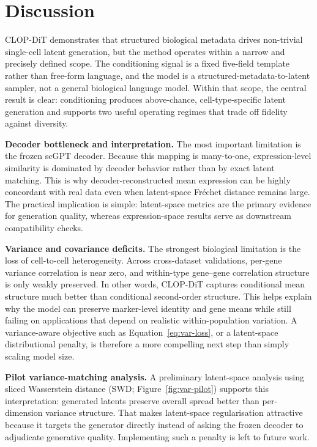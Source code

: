 \documentclass[preprint,12pt]{elsarticle}
\begin{document}
\section{Discussion}\label{sec:discussion}

 CLOP-DiT demonstrates that structured biological metadata drives non-trivial single-cell latent generation, but the method operates within a narrow and precisely defined scope. The conditioning signal is a fixed five-field template rather than free-form language, and the model is a structured-metadata-to-latent sampler, not a general biological language model. Within that scope, the central result is clear: conditioning produces above-chance, cell-type-specific latent generation and supports two useful operating regimes that trade off fidelity against diversity.

\textbf{Decoder bottleneck and interpretation.} The most important limitation is the frozen scGPT decoder. Because this mapping is many-to-one, expression-level similarity is dominated by decoder behavior rather than by exact latent matching. This is why decoder-reconstructed mean expression can be highly concordant with real data even when latent-space Fr\'{e}chet distance remains large. The practical implication is simple: latent-space metrics are the primary evidence for generation quality, whereas expression-space results serve as downstream compatibility checks.

\textbf{Variance and covariance deficits.} The strongest biological limitation is the loss of cell-to-cell heterogeneity. Across cross-dataset validations, per-gene variance correlation is near zero, and within-type gene--gene correlation structure is only weakly preserved. In other words, CLOP-DiT captures conditional mean structure much better than conditional second-order structure. This helps explain why the model can preserve marker-level identity and gene means while still failing on applications that depend on realistic within-population variation. A variance-aware objective such as Equation~\ref{eq:var-loss}, or a latent-space distributional penalty, is therefore a more compelling next step than simply scaling model size.

\textbf{Pilot variance-matching analysis.} A preliminary latent-space analysis using sliced Wasserstein distance (SWD; Figure~\ref{fig:var-pilot}) supports this interpretation: generated latents preserve overall spread better than per-dimension variance structure. That makes latent-space regularisation attractive because it targets the generator directly instead of asking the frozen decoder to adjudicate generative quality. Implementing such a penalty is left to future work.
\end{document}
